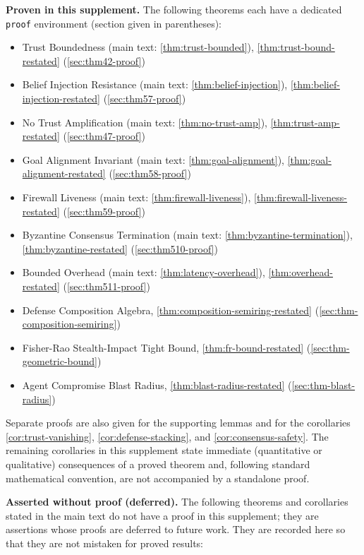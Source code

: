 \documentclass[
]{article}
\providecommand{\tightlist}{%
  \setlength{\itemsep}{0pt}\setlength{\parskip}{0pt}}
\begin{document}
\textbf{Proven in this supplement.} The following theorems each have a
dedicated \texttt{proof} environment (section given in parentheses):

\begin{itemize}
\tightlist
\item
  Trust Boundedness (main text: \cref{thm:trust-bounded}),
  \cref{thm:trust-bound-restated} (\cref{sec:thm42-proof})
\item
  Belief Injection Resistance (main text: \cref{thm:belief-injection}),
  \cref{thm:belief-injection-restated} (\cref{sec:thm57-proof})
\item
  No Trust Amplification (main text: \cref{thm:no-trust-amp}),
  \cref{thm:trust-amp-restated} (\cref{sec:thm47-proof})
\item
  Goal Alignment Invariant (main text: \cref{thm:goal-alignment}),
  \cref{thm:goal-alignment-restated} (\cref{sec:thm58-proof})
\item
  Firewall Liveness (main text: \cref{thm:firewall-liveness}),
  \cref{thm:firewall-liveness-restated} (\cref{sec:thm59-proof})
\item
  Byzantine Consensus Termination (main text:
  \cref{thm:byzantine-termination}), \cref{thm:byzantine-restated}
  (\cref{sec:thm510-proof})
\item
  Bounded Overhead (main text: \cref{thm:latency-overhead}),
  \cref{thm:overhead-restated} (\cref{sec:thm511-proof})
\item
  Defense Composition Algebra, \cref{thm:composition-semiring-restated}
  (\cref{sec:thm-composition-semiring})
\item
  Fisher-Rao Stealth-Impact Tight Bound, \cref{thm:fr-bound-restated}
  (\cref{sec:thm-geometric-bound})
\item
  Agent Compromise Blast Radius, \cref{thm:blast-radius-restated}
  (\cref{sec:thm-blast-radius})
\end{itemize}

Separate proofs are also given for the supporting lemmas and for the
corollaries \cref{cor:trust-vanishing}, \cref{cor:defense-stacking}, and
\cref{cor:consensus-safety}. The remaining corollaries in this
supplement state immediate (quantitative or qualitative) consequences of
a proved theorem and, following standard mathematical convention, are
not accompanied by a standalone proof.

\textbf{Asserted without proof (deferred).} The following theorems and
corollaries stated in the main text do not have a proof in this
supplement; they are assertions whose proofs are deferred to future
work. They are recorded here so that they are not mistaken for proved
results:
\end{document}
